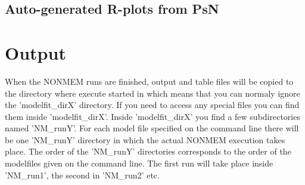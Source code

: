 \subsection{Auto-generated R-plots from PsN}
\newcommand{\rplotsconditions}{The default execute template 
requires the xpose4 R library. It also relies on Xpose-type tables being 
created, such as sdtab, patab and cotab, with the correct run number. 
See the Xpose documentation for requirements on such table files.
If option -subset\_variable\_rplots is used, 
the user must ensure that the subset variable
is printed to one of the xpose tables, for example sdtab, and then
there will be separate plots created for
subsets of the data, via xpose options 'subset' and 'by'. 
If the conditions are not fulfilled then no pdf will be generated,
see the .Rout file in the main run directory for error messages.}


\section{Output}
When the NONMEM runs are finished, output and table files will be copied to the directory where execute started in which means that you can normaly ignore the 'modelfit\_dirX' directory. If you need to access any special files you can find them inside 'modelfit\_dirX'. Inside 'modelfit\_dirX' you find a few subdirectories named 'NM\_runY'. For each model file specified on the command line there will be one 'NM\_runY' directory in which the actual NONMEM execution takes place. The order of the 'NM\_runY' directories corresponds to the order of the modelfiles given on the command line. The first run will take place inside 'NM\_run1', the second in 'NM\_run2' etc.




